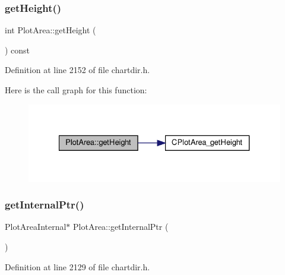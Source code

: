 \subsubsection{\texorpdfstring{get\+Height()}{getHeight()}}
{\footnotesize\ttfamily int Plot\+Area\+::get\+Height (\begin{DoxyParamCaption}{ }\end{DoxyParamCaption}) const\hspace{0.3cm}{\ttfamily [inline]}}



Definition at line 2152 of file chartdir.\+h.

Here is the call graph for this function\+:
\nopagebreak
\begin{figure}[H]
\begin{center}
\leavevmode
\includegraphics[width=327pt]{class_plot_area_a2325837475a874fe9b8eff161422f973_cgraph}
\end{center}
\end{figure}
\mbox{\label{class_plot_area_affa85a783dca97e6e63717697f395f96}} 
\subsubsection{\texorpdfstring{get\+Internal\+Ptr()}{getInternalPtr()}}
{\footnotesize\ttfamily Plot\+Area\+Internal$\ast$ Plot\+Area\+::get\+Internal\+Ptr (\begin{DoxyParamCaption}{ }\end{DoxyParamCaption})\hspace{0.3cm}{\ttfamily [inline]}}



Definition at line 2129 of file chartdir.\+h.

\mbox{\label{class_plot_area_a315c48a42edd9b50b9d9cb83f1adaaf4}} 
